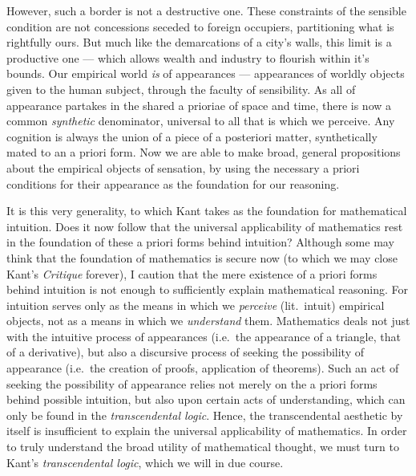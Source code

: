 \noindent
However, such a border is not a destructive one. These constraints of the sensible condition are not concessions seceded to foreign occupiers, partitioning what is rightfully ours. But much like the demarcations of a city's walls, this limit is a productive one --- which allows wealth and industry to flourish within it's bounds. Our empirical world \emph{is} of appearances --- appearances of worldly objects given to the human subject, through the faculty of sensibility. As all of appearance partakes in the shared a prioriae of space and time, there is now a common \emph{synthetic} denominator, universal to all that is which we perceive. Any cognition is always the union of a piece of a posteriori matter, synthetically mated to an a priori form. Now we are able to make broad, general propositions about the empirical objects of sensation, by using the necessary a priori conditions for their appearance as the foundation for our reasoning.

\noindent
It is this very generality, to which Kant takes as the foundation for mathematical intuition. Does it now follow that the universal applicability of mathematics rest in the foundation of these a priori forms behind intuition? Although some may think that the foundation of mathematics is secure now (to which we may close Kant's \emph{Critique} forever), I caution that the mere existence of a priori forms behind intuition is not enough to sufficiently explain mathematical reasoning. For intuition serves only as the means in which we \emph{perceive} (lit.\ intuit) empirical objects, not as a means in which we \emph{understand} them. Mathematics deals not just with the intuitive process of appearances (i.e.\ the appearance of a triangle, that of a derivative), but also a discursive process of seeking the possibility of appearance (i.e.\ the creation of proofs, application of theorems). Such an act of seeking the possibility of appearance relies not merely on the a priori forms behind possible intuition, but also upon certain acts of understanding, which can only be found in the \emph{transcendental logic}. Hence, the transcendental aesthetic by itself is insufficient to explain the universal applicability of mathematics. In order to truly understand the broad utility of mathematical thought, we must turn to Kant's \emph{transcendental logic}, which we will in due course.

\clearpage

